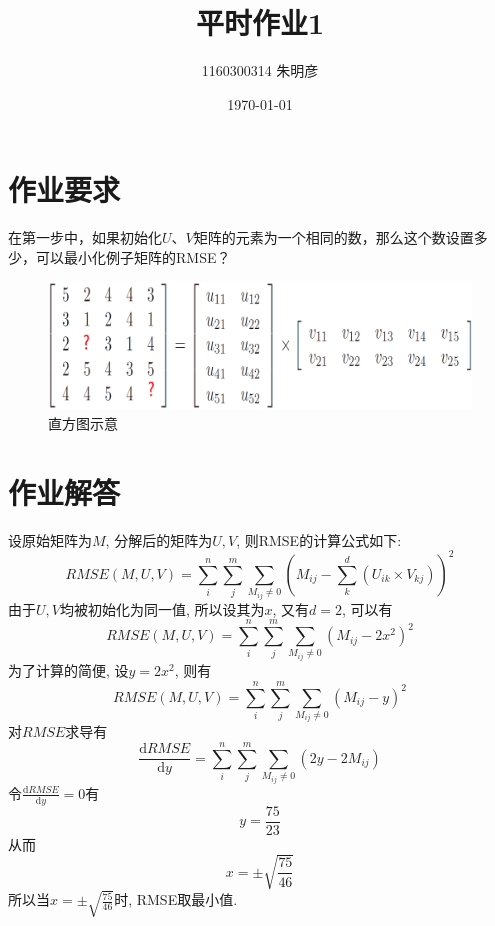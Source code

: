 \documentclass[12pt]{article}
\theoremstyle{definition}
\begin{document}
\title{平时作业1}
\author{1160300314 朱明彦}
\date{\today} %
\maketitle

\section{作业要求}
在第一步中，如果初始化$U$、$V$矩阵的元素为一个相同的数，那么这个数设置多少，可以最小化例子矩阵的RMSE？

\begin{figure}[H]
  \centering
  \includegraphics[width=0.8\linewidth]{fig/demand.png}
  \caption{直方图示意}
  \label{fig:demand}
\end{figure}

\section{作业解答}
设原始矩阵为$M$, 分解后的矩阵为$U, V$, 则RMSE的计算公式如下:
$$
RMSE(M, U, V) = \sum_{i}^{n}\sum_{j}^{m}\sum_{M_{ij} \neq 0}\left(M_{ij} - \sum_{k}^{d}\left(U_{ik} \times V_{kj}\right)\right)^{2}
$$
由于$U, V$均被初始化为同一值, 所以设其为$x$, 又有$d = 2$, 可以有
$$
RMSE(M, U, V) = \sum_{i}^{n}\sum_{j}^{m}\sum_{M_{ij} \neq 0}\left(M_{ij} - 2x^2\right)^{2}
$$
为了计算的简便, 设$y = 2x^2$, 则有
$$
RMSE(M, U, V) = \sum_{i}^{n}\sum_{j}^{m}\sum_{M_{ij} \neq 0}\left(M_{ij} - y\right)^{2}
$$
对$RMSE$求导有
$$
\dfrac{\mathrm{d} RMSE }{\mathrm{d} y} = \sum_{i}^{n}\sum_{j}^{m}\sum_{M_{ij} \neq 0}\left(2y - 2M_{ij}\right)
$$
令$\frac{\mathrm{d} RMSE }{\mathrm{d} y} = 0$有
$$
y = \frac{75}{23}
$$
从而
$$
x = \pm \sqrt{\frac{75}{46}}
$$
所以当$x = \pm \sqrt{\frac{75}{46}}$时, RMSE取最小值.
\end{document}
